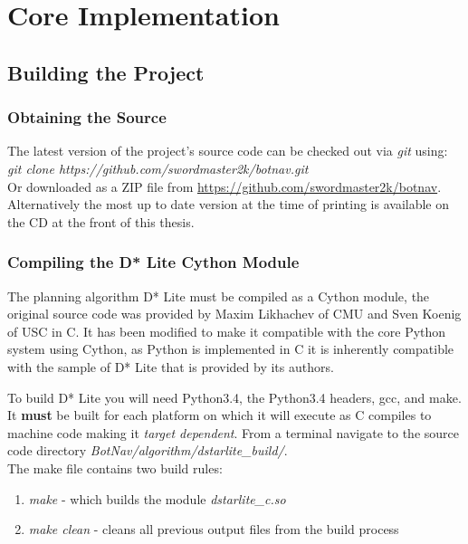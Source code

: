 \chapter{Core Implementation}


\section{Building the Project}

\subsection{Obtaining the Source}
\noindent 
The latest version of the project's source code can be checked out via \textit{git} using: \\

\indent \textit{git clone https://github.com/swordmaster2k/botnav.git} \\

\noindent
Or downloaded as a ZIP file from \url{https://github.com/swordmaster2k/botnav}. \\ 

\noindent
Alternatively the most up to date version at the time of printing is available on the CD at the front of this thesis.

\subsection{Compiling the D* Lite Cython Module}
\noindent
The planning algorithm D* Lite must be compiled as a Cython module, the original source code was provided by Maxim Likhachev of CMU and Sven Koenig of USC in C. It has been modified to make it compatible with the core Python system using Cython, as Python is implemented in C it is inherently compatible with the sample of D* Lite that is provided by its authors.

\noindent
To build D* Lite you will need Python3.4, the Python3.4 headers, gcc, and make. It \textbf{must} be built for each platform on which it will execute as C compiles to machine code making it \textit{target dependent}. From a terminal navigate to the source code directory \textit{BotNav/algorithm/dstarlite\_build/}. \\

\noindent
The make file contains two build rules:
\begin{enumerate}
\item \textit{make} - \indent which builds the module \textit{dstarlite\_c.so} 
\item \textit{make clean} - \indent cleans all previous output files from the build process \\
\end{enumerate}

